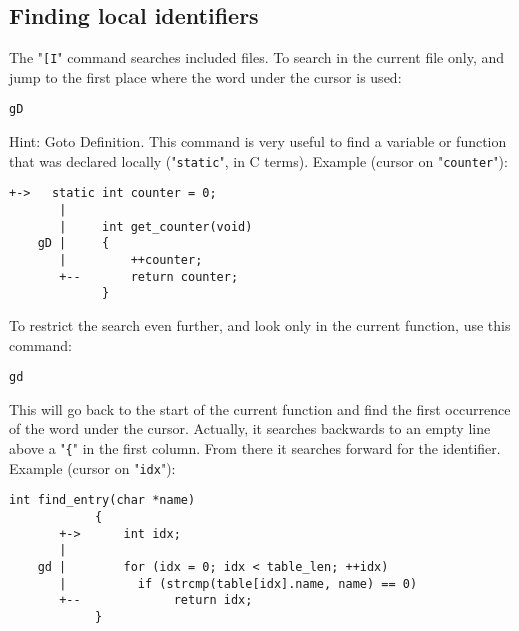 \subsection{Finding local identifiers}
The "\verb![I!" command searches included files.
To search in the current file only, and jump to the first place where the word under the cursor is used:

\begin{Verbatim}[samepage=true]
 gD
\end{Verbatim}

Hint: Goto Definition.
This command is very useful to find a variable or function that was declared locally ("\verb!static!", in C terms).
Example (cursor on "\verb!counter!"):

\begin{Verbatim}[samepage=true]
       +->   static int counter = 0;
       |
       |     int get_counter(void)
    gD |     {
       |         ++counter;
       +--       return counter;
             }
\end{Verbatim}

To restrict the search even further, and look only in the current function, use this command:

\begin{Verbatim}[samepage=true]
 gd
\end{Verbatim}

This will go back to the start of the current function and find the first occurrence of the word under the cursor.
Actually, it searches backwards to an empty line above a "\verb!{!" in the first column.
From there it searches forward for the identifier.
Example (cursor on "\verb!idx!"):

\begin{Verbatim}[samepage=true]
            int find_entry(char *name)
            {
       +->      int idx;
       |
    gd |        for (idx = 0; idx < table_len; ++idx)
       |          if (strcmp(table[idx].name, name) == 0)
       +--             return idx;
            }
\end{Verbatim}
\clearpage
